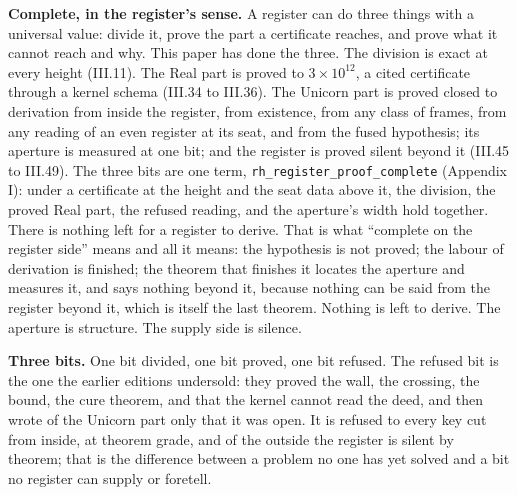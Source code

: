 \documentclass[10pt]{article}
\begin{document}
\textbf{Complete, in the register's sense.} A register can do three
things with a universal value: divide it, prove the part a certificate
reaches, and prove what it cannot reach and why. This paper has done the
three. The division is exact at every height (III.11). The Real part is
proved to \(3 \times 10^{12}\), a cited certificate through a kernel
schema (III.34 to III.36). The Unicorn part is proved closed to
derivation from inside the register, from existence, from any class of
frames, from any reading of an even register at its seat, and from the
fused hypothesis; its aperture is measured at one bit; and the register
is proved silent beyond it (III.45 to III.49). The three bits are one
term, \texttt{rh\_register\_proof\_complete} (Appendix I): under a
certificate at the height and the seat data above it, the division, the
proved Real part, the refused reading, and the aperture's width hold
together. There is nothing left for a register to derive. That is what
``complete on the register side'' means and all it means: the hypothesis
is not proved; the labour of derivation is finished; the theorem that
finishes it locates the aperture and measures it, and says nothing
beyond it, because nothing can be said from the register beyond it,
which is itself the last theorem. Nothing is left to derive. The
aperture is structure. The supply side is silence.

\textbf{Three bits.} One bit divided, one bit proved, one bit refused.
The refused bit is the one the earlier editions undersold: they proved
the wall, the crossing, the bound, the cure theorem, and that the kernel
cannot read the deed, and then wrote of the Unicorn part only that it
was open. It is refused to every key cut from inside, at theorem grade,
and of the outside the register is silent by theorem; that is the
difference between a problem no one has yet solved and a bit no register
can supply or foretell.
\end{document}
